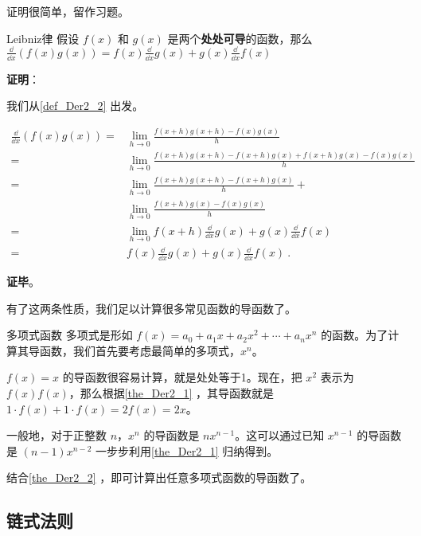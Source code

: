 证明很简单，留作习题。

\begin{theorem}{Leibniz律}\label{the_Der2_1}
假设 $f(x)$ 和 $g(x)$ 是两个\textbf{处处可导}的函数，那么 $\frac{\dd}{\dd x}(f(x)g(x))=f(x)\frac{\dd}{\dd x}g(x)+g(x)\frac{\dd}{\dd x}f(x)$
\end{theorem}

\textbf{证明}：

我们从\autoref{def_Der2_2} 出发。

\begin{equation}
\begin{aligned}
\frac{\dd}{\dd x}(f(x)g(x))=&\lim\limits_{h\to 0}\frac{f(x+h)g(x+h)-f(x)g(x)}{h}\\
=&\lim\limits_{h\to 0}\frac{f(x+h)g(x+h)-f(x+h)g(x)+f(x+h)g(x)-f(x)g(x)}{h}\\
=&\lim\limits_{h\to 0}\frac{f(x+h)g(x+h)-f(x+h)g(x)}{h}+\\&\lim\limits_{h\to 0}\frac{f(x+h)g(x)-f(x)g(x)}{h}\\
=&\lim\limits_{h\to 0}f(x+h)\frac{\dd}{\dd x}g(x)+g(x)\frac{\dd}{\dd x}f(x)\\
=&f(x)\frac{\dd}{\dd x}g(x)+g(x)\frac{\dd}{\dd x}f(x)~.
\end{aligned}
\end{equation}

\textbf{证毕}。

有了这两条性质，我们足以计算很多常见函数的导函数了。

\begin{example}{多项式函数}
多项式是形如 $f(x)=a_0+a_1x+a_2x^2+\cdots+a_nx^n$ 的函数。为了计算其导函数，我们首先要考虑最简单的多项式，$x^n$。

$f(x)=x$ 的导函数很容易计算，就是处处等于1。现在，把 $x^2$ 表示为 $f(x)f(x)$，那么根据\autoref{the_Der2_1} ，其导函数就是 $1\cdot f(x)+1\cdot f(x)=2f(x)=2x$。

一般地，对于正整数 $n$，$x^n$ 的导函数是 $nx^{n-1}$。这可以通过已知 $x^{n-1}$ 的导函数是 $(n-1)x^{n-2}$ 一步步利用\autoref{the_Der2_1} 归纳得到。

结合\autoref{the_Der2_2} ，即可计算出任意多项式函数的导函数了。
\end{example}


\subsection{链式法则}













